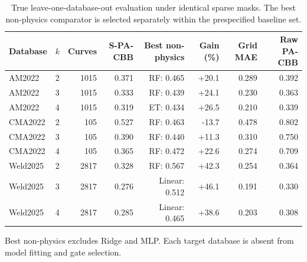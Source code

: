 \begin{table}[t]
\centering
\small
\setlength{\tabcolsep}{4.2pt}
\caption{True leave-one-database-out evaluation under identical sparse masks. The best non-physics comparator is selected separately within the prespecified baseline set.}
\label{tab:lodo_latest}
\begin{tabular}{llrrrrrr}
\toprule
Database & $k$ & Curves & S-PA-CBB & Best non-physics & Gain (\%) & Grid MAE & Raw PA-CBB \\
\midrule
AM2022 & 2 & 1015 & 0.371 & RF: 0.465 & +20.1 & 0.289 & 0.392 \\
AM2022 & 3 & 1015 & 0.333 & RF: 0.439 & +24.1 & 0.230 & 0.363 \\
AM2022 & 4 & 1015 & 0.319 & ET: 0.434 & +26.5 & 0.210 & 0.339 \\
CMA2022 & 2 & 105 & 0.527 & RF: 0.463 & -13.7 & 0.478 & 0.802 \\
CMA2022 & 3 & 105 & 0.390 & RF: 0.440 & +11.3 & 0.310 & 0.750 \\
CMA2022 & 4 & 105 & 0.365 & RF: 0.472 & +22.6 & 0.274 & 0.709 \\
Weld2025 & 2 & 2817 & 0.328 & RF: 0.567 & +42.3 & 0.254 & 0.364 \\
Weld2025 & 3 & 2817 & 0.276 & Linear: 0.512 & +46.1 & 0.191 & 0.330 \\
Weld2025 & 4 & 2817 & 0.285 & Linear: 0.465 & +38.6 & 0.203 & 0.308 \\
\bottomrule
\end{tabular}
\begin{minipage}{0.98\textwidth}\footnotesize Best non-physics excludes Ridge and MLP. Each target database is absent from model fitting and gate selection.\end{minipage}
\end{table}